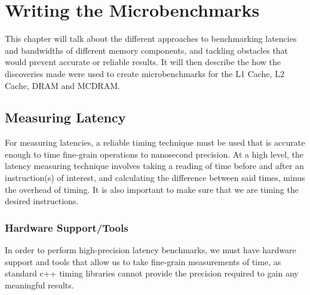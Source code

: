 \documentclass[bsc,frontabs,twoside,singlespacing,parskip,deptreport]{infthesis}     %
\begin{document}
\chapter{Writing the Microbenchmarks}\label{chap:writing-benchmarks}
This chapter will talk about the different approaches to benchmarking latencies and bandwidths of different memory components, and tackling obstacles that would prevent accurate or reliable results. It will then describe the how the discoveries made were used to create microbenchmarks for the L1 Cache, L2 Cache, DRAM and MCDRAM.

\section{Measuring Latency}\label{measuring-latency}
For measuring latencies, a reliable timing technique must be used that is accurate enough to time fine-grain operations to nanosecond precision. At a high level, the latency measuring technique involves taking a reading of time before and after an instruction(s) of interest, and calculating the difference between said times, minus the overhead of timing. It is also important to make sure that we are timing the desired instructions.

\subsection{Hardware Support/Tools}
In order to perform high-precision latency benchmarks, we must have hardware support and tools that allow us to take fine-grain measurements of time, as standard c++ timing libraries cannot provide the precision required to gain any meaningful results.
\end{document}
